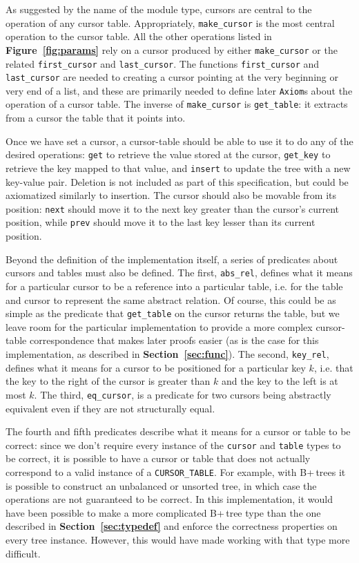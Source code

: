 \documentclass[12pt]{article}
\begin{document}
As suggested by the name of the module type, cursors are central to the operation of any cursor table. Appropriately, \texttt{make\_cursor} is the most central operation to the cursor table. All the other operations listed in \textbf{Figure~\ref{fig:params}} rely on a cursor produced by either \texttt{make\_cursor} or the related \texttt{first\_cursor} and \texttt{last\_cursor}. The functions \texttt{first\_cursor} and \texttt{last\_cursor} are needed to creating a cursor pointing at the very beginning or very end of a list, and these are primarily needed to define later \texttt{Axiom}s about the operation of a cursor table. The inverse of \texttt{make\_cursor} is \texttt{get\_table}: it extracts from a cursor the table that it points into. 

Once we have set a cursor, a cursor-table should be able to use it to do any of the desired operations: \texttt{get} to retrieve the value stored at the cursor, \texttt{get\_key} to retrieve the key mapped to that value, and \texttt{insert} to update the tree with a new key-value pair. Deletion is not included as part of this specification, but could be axiomatized similarly to insertion. The cursor should also be movable from its position: \texttt{next} should move it to the next key greater than the cursor’s current position, while \texttt{prev} should move it to the last key lesser than its current position.

Beyond the definition of the implementation itself, a series of predicates about cursors and tables must also be defined. The first, \texttt{abs\_rel}, defines what it means for a particular cursor to be a reference into a particular table, i.e. for the table and cursor to represent the same abstract relation. Of course, this could be as simple as the predicate that \texttt{get\_table} on the cursor returns the table, but we leave room for the particular implementation to provide a more complex cursor-table correspondence that makes later proofs easier (as is the case for this implementation, as described in \textbf{Section~\ref{sec:func}}). The second, \texttt{key\_rel}, defines what it means for a cursor to be positioned for a particular key $k$, i.e. that the key to the right of the cursor is greater than $k$ and the key to the left is at most $k$. The third, \texttt{eq\_cursor}, is a predicate for two cursors being abstractly equivalent even if they are not structurally equal.

The fourth and fifth predicates describe what it means for a cursor or table to be correct: since we don’t require every instance of the \texttt{cursor} and \texttt{table} types to be correct, it is possible to have a cursor or table that does not actually correspond to a valid instance of a \texttt{CURSOR\_TABLE}. For example, with B+\,trees it is possible to construct an unbalanced or unsorted tree, in which case the operations are not guaranteed to be correct. In this implementation, it would have been possible to make a more complicated B+\,tree type than the one described in \textbf{Section~\ref{sec:typedef}} and enforce the correctness properties on every tree instance. However, this would have made working with that type more difficult.
\end{document}
